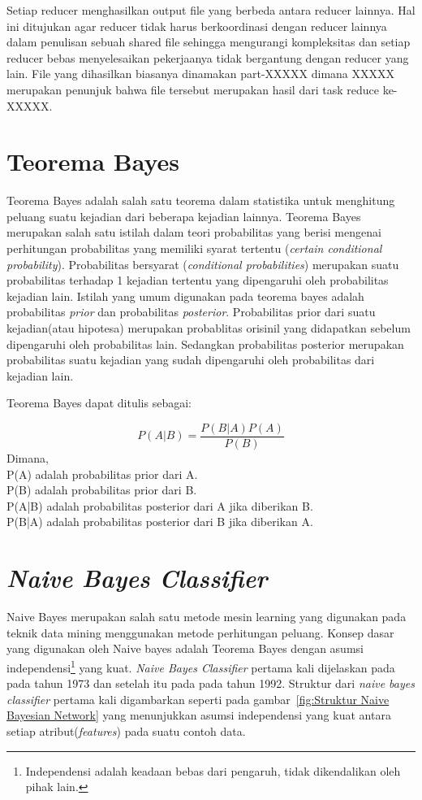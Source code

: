 Setiap reducer menghasilkan output file yang berbeda antara reducer lainnya. Hal ini ditujukan agar reducer tidak harus berkoordinasi dengan reducer lainnya dalam penulisan sebuah shared file sehingga mengurangi kompleksitas dan setiap reducer bebas menyelesaikan pekerjaanya tidak bergantung dengan reducer yang lain. File yang dihasilkan biasanya dinamakan part-XXXXX dimana XXXXX merupakan penunjuk bahwa file tersebut merupakan hasil dari task reduce ke-XXXXX.
		
\section{Teorema Bayes}
	
	\cite{garg2013design} Teorema Bayes adalah salah satu teorema dalam statistika untuk menghitung peluang suatu kejadian dari beberapa kejadian lainnya. Teorema Bayes merupakan salah satu istilah dalam teori probabilitas yang berisi mengenai perhitungan probabilitas yang memiliki syarat tertentu (\textit{certain conditional probability}). Probabilitas bersyarat (\textit{conditional probabilities}) merupakan suatu probabilitas terhadap 1 kejadian tertentu yang dipengaruhi oleh probabilitas kejadian lain. Istilah yang umum digunakan pada teorema bayes adalah probabilitas \textit{prior} dan probabilitas \textit{posterior}. Probabilitas prior dari suatu kejadian(atau hipotesa) merupakan probablitas orisinil yang didapatkan sebelum dipengaruhi oleh probabilitas lain. Sedangkan probabilitas posterior merupakan probabilitas suatu kejadian yang sudah dipengaruhi oleh probabilitas dari kejadian lain.
	
	Teorema Bayes dapat ditulis sebagai:
	
\begin{equation} \label{eq:1}
P(A|B) = \dfrac{P(B|A)P(A)}{P(B)}
\end{equation}
Dimana,\\
P(A) adalah probabilitas prior dari A.\\
P(B) adalah probabilitas prior dari B.\\
P(A|B) adalah probabilitas posterior dari A jika diberikan B.\\
P(B|A) adalah probabilitas posterior dari B jika diberikan A.

\section{\textit{Naive Bayes Classifier}}
	
	 Naive Bayes merupakan salah satu metode mesin learning yang digunakan pada teknik data mining menggunakan metode perhitungan peluang. Konsep dasar yang digunakan oleh Naive bayes adalah Teorema Bayes dengan asumsi independensi\footnote{Independensi adalah keadaan bebas dari pengaruh, tidak dikendalikan oleh pihak lain.} yang kuat. \textit{Naive Bayes Classifier} pertama kali dijelaskan pada \cite{ro1973pattern} pada tahun 1973 dan setelah itu pada \cite{langley1992analysis} pada tahun 1992. Struktur dari \textit{naive bayes classifier} pertama kali digambarkan seperti pada gambar~\ref{fig:Struktur Naive Bayesian Network} yang menunjukkan asumsi independensi yang kuat antara setiap atribut(\textit{features}) pada suatu contoh data.
	 
